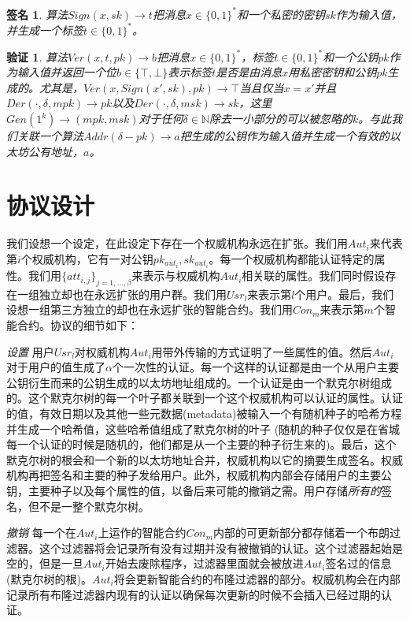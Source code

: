 \documentclass[UTF8]{ctexart}
\newtheorem*{sign}{签名}
\newtheorem*{verify}{验证}
\begin{document}
\begin{sign}
算法$Sign(x, sk) \to t$把消息$x \in \{0, 1\}^*$和一个私密的密钥$sk$作为输入值，并生成一个标签$t \in \{0, 1\}^*$。
\end{sign}

\begin{verify}
算法$Ver(x, t, pk) \to b$把消息$x \in \{0, 1\}^*$，标签$t \in \{0, 1\}^*$和一个公钥$pk$作为输入值并返回一个位$b \in \{\top, \bot\}$表示标签$t$是否是由消息$x$用私密密钥和公钥$pk$生成的。尤其是，$Ver(x, Sign(x', sk), pk) \to \top$当且仅当$x = x'$并且$Der(\cdot, \delta, mpk) \to pk$以及$Der(\cdot, \delta, msk) \to sk$，这里$Gen(1^k) \to (mpk, msk)$对于任何$\delta \in \mathbb{N}$除去一小部分的可以被忽略的$k$。与此我们关联一个算法$Addr(\delta-pk) \to a$把生成的公钥作为输入值并生成一个有效的以太坊公有地址，$a$。
\end{verify}

\section{协议设计}
我们设想一个设定，在此设定下存在一个权威机构永远在扩张。我们用$Aut_i$来代表第$i$个权威机构，它有一对公钥$pk_{aut_i}, sk_{aut_i}$。每一个权威机构都能认证特定的属性。我们用$\{att_{i, j}\}_{j=1,\ldots,\beta}$来表示与权威机构$Aut_i$相关联的属性。我们同时假设存在一组独立却也在永远扩张的用户群。我们用$Usr_l$来表示第$l$个用户。最后，我们设想一组第三方独立的却也在永远扩张的智能合约。我们用$Con_m$来表示第$m$个智能合约。协议的细节如下：

\noindent \textit{设置} \hspace{0.1cm} 用户$Usr_l$对权威机构$Aut_i$用带外传输的方式证明了一些属性的值。然后$Aut_i$对于用户的值生成了$\alpha$个一次性的认证。每一个这样的认证都是由一个从用户主要公钥衍生而来的公钥生成的以太坊地址组成的。一个认证是由一个默克尔树组成的。这个默克尔树的每一个叶子都关联到一个这个权威机构可以认证的属性。认证的值，有效日期以及其他一些元数据(metadata)被输入一个有随机种子的哈希方程并生成一个哈希值，这些哈希值组成了默克尔树的叶子 (随机的种子仅仅是在省城每一个认证的时候是随机的，他们都是从一个主要的种子衍生来的)。最后，这个默克尔树的根会和一个新的以太坊地址合并，权威机构以它的摘要生成签名。权威机构再把签名和主要的种子发给用户。此外，权威机构内部会存储用户的主要公钥，主要种子以及每个属性的值，以备后来可能的撤销之需。用户存储\emph{所有的}签名，但不是一整个默克尔树。

\noindent \textit{撤销} \hspace{0.1cm} 每一个在$Aut_i$上运作的智能合约$Con_m$内部的可更新部分都存储着一个布朗过滤器。这个过滤器将会记录所有没有过期并没有被撤销的认证。这个过滤器起始是空的，但是一旦$Aut_i$开始去废除程序，过滤器里面就会被放进$Aut_i$签名过的信息(默克尔树的根)。$Aut_i$将会更新智能合约的布隆过滤器的部分。权威机构会在内部记录所有布隆过滤器内现有的认证以确保每次更新的时候不会插入已经过期的认证。
\end{document}

